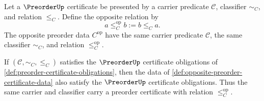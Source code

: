 \begin{definition}
\label{def:opposite-preorder-certificate-data}
Let a $\PreorderUp$ certificate be presented by a carrier predicate $\mathcal C$, classifier $\sim_C$, and relation $\le_C$. Define the opposite relation by
$$
a\le_C^{\mathrm{op}} b:=b\le_C a.
$$
The opposite preorder data $C^{\mathrm{op}}$ have the same carrier predicate $\mathcal C$, the same classifier $\sim_C$, and relation $\le_C^{\mathrm{op}}$.
\end{definition}

\begin{theorem}
\label{thm:opposite-preorder-certificate}
If $(\mathcal C,\sim_C,\le_C)$ satisfies the $\PreorderUp$ certificate obligations of \autoref{def:preorder-certificate-obligations}, then the data of \autoref{def:opposite-preorder-certificate-data} also satisfy the $\PreorderUp$ certificate obligations. Thus the same carrier and classifier carry a preorder certificate with relation $\le_C^{\mathrm{op}}$.
\end{theorem}
